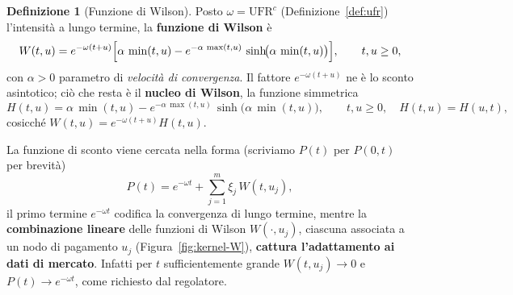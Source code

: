 \documentclass[11pt,a4paper]{article}
\theoremstyle{plain}
\theoremstyle{definition}
\newtheorem{definizione}[teorema]{Definizione}
\theoremstyle{remark}
\newcommand{\UFR}{\mathrm{UFR}}
\newcommand{\LLP}{\mathrm{LLP}}
\begin{document}

\begin{definizione}[Funzione di Wilson]
\label{def:wilson}
Posto $\omega=\UFR^c$ (Definizione~\ref{def:ufr}) l'intensit\`a a lungo termine, la \textbf{funzione di Wilson} \`e
\begin{equation}
  W(t,u) = e^{-\omega(t+u)}\Bigl[\alpha\,\min(t,u)
           - e^{-\alpha\,\max(t,u)}\,\sinh\!\bigl(\alpha\,\min(t,u)\bigr)\Bigr],
  \qquad t,u \ge 0,
\end{equation}
con $\alpha>0$ parametro di \emph{velocit\`a di convergenza}. Il fattore $e^{-\omega(t+u)}$ ne
\`e lo sconto asintotico; ci\`o che resta \`e il \textbf{nucleo di Wilson}, la funzione
simmetrica
\begin{equation}
  H(t,u) = \alpha\,\min(t,u) - e^{-\alpha\,\max(t,u)}\,\sinh\!\bigl(\alpha\,\min(t,u)\bigr),
  \qquad t,u\ge 0, \quad H(t,u) = H(u,t),
\end{equation}
cosicch\'e $W(t,u) = e^{-\omega(t+u)}H(t,u)$.

\end{definizione}

La funzione di sconto viene cercata nella forma (scriviamo $P(t)$ per $P(0,t)$ per brevit\`a)
\begin{equation}
  P(t) = e^{-\omega t} + \textstyle\sum_{j=1}^{m} \xi_j\, W(t,u_j),
  \label{eq:sw-P-W}
\end{equation}
il primo termine $e^{-\omega t}$ codifica la convergenza di lungo termine, mentre la
\textbf{combinazione lineare} delle funzioni di Wilson $W(\cdot,u_j)$, ciascuna associata
a un nodo di pagamento $u_j$ (Figura~\ref{fig:kernel-W}), \textbf{cattura l'adattamento ai dati di mercato}. Infatti per $t$ sufficientemente grande $W(t,u_j)\to 0$ e $P(t)\to e^{-\omega t}$,
come richiesto dal regolatore.
\end{document}
